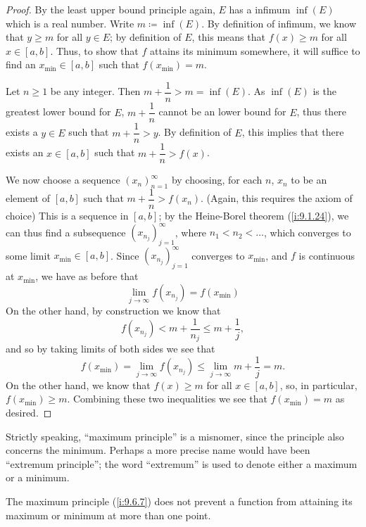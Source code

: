\begin{proof}
  By the least upper bound principle again, \(E\) has a infimum \(\inf(E)\) which is a real number.
  Write \(m \coloneqq \inf(E)\).
  By definition of infimum, we know that \(y \geq m\) for all \(y \in E\);
  by definition of \(E\), this means that \(f(x) \geq m\) for all \(x \in [a, b]\).
  Thus, to show that \(f\) attains its minimum somewhere, it will suffice to find an \(x_{\min} \in [a, b]\) such that \(f(x_{\min}) = m\).

  Let \(n \geq 1\) be any integer.
  Then \(m + \dfrac{1}{n} > m = \inf(E)\).
  As \(\inf(E)\) is the greatest lower bound for \(E\), \(m + \dfrac{1}{n}\) cannot be an lower bound for \(E\), thus there exists a \(y \in E\) such that \(m + \dfrac{1}{n} > y\).
  By definition of \(E\), this implies that there exists an \(x \in [a, b]\) such that \(m + \dfrac{1}{n} > f(x)\).

  We now choose a sequence \((x_n)_{n = 1}^\infty\) by choosing, for each \(n\), \(x_n\) to be an element of \([a, b]\) such that \(m + \dfrac{1}{n} > f(x_n)\).
  (Again, this requires the axiom of choice)
  This is a sequence in \([a, b]\);
  by the Heine-Borel theorem (\cref{i:9.1.24}), we can thus find a subsequence \((x_{n_j})_{j = 1}^\infty\), where \(n_1 < n_2 < \dots\), which converges to some limit \(x_{\min} \in [a, b]\).
  Since \((x_{n_j})_{j = 1}^\infty\) converges to \(x_{\min}\), and \(f\) is continuous at \(x_{\min}\), we have as before that
  \[
    \lim_{j \to \infty} f(x_{n_j}) = f(x_{\min})
  \]
  On the other hand, by construction we know that
  \[
    f(x_{n_j}) < m + \dfrac{1}{n_j} \leq m + \dfrac{1}{j},
  \]
  and so by taking limits of both sides we see that
  \[
    f(x_{\min}) = \lim_{j \to \infty} f(x_{n_j}) \leq \lim_{j \to \infty} m + \dfrac{1}{j} = m.
  \]
  On the other hand, we know that \(f(x) \geq m\) for all \(x \in [a, b]\), so, in particular, \(f(x_{\min}) \geq m\).
  Combining these two inequalities we see that \(f(x_{\min}) = m\) as desired.
\end{proof}

\begin{rmk}\label{i:9.6.8}
  Strictly speaking, ``maximum principle'' is a misnomer, since the principle also concerns the minimum.
  Perhaps a more precise name would have been ``extremum principle'';
  the word ``extremum'' is used to denote either a maximum or a minimum.
\end{rmk}

\begin{note}
  The maximum principle (\cref{i:9.6.7}) does not prevent a function from attaining its maximum or minimum at more than one point.
\end{note}

